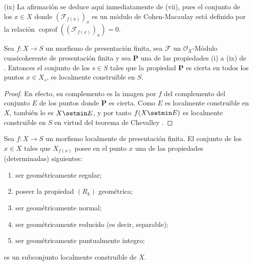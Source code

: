 (ix) La afirmación se deduce aquí inmediatamente de (vii), pues el conjunto de los $x\in X$ donde
$(\mathcal F_{f(x)})_x$ es un módulo de Cohen-Macaulay está definido por la
relación $\operatorname{coprof}((\mathcal F_{f(x)})_x)=0$.

\begin{corollary}[9.9.3]
\label{IV.9.9.3}
Sea $f:X\to S$ un morfismo de presentación finita, sea $\mathcal F$ un $\mathcal O_X$-Módulo cuasicoherente de presentación finita y sea $\boldsymbol{P}$ una de las propiedades \textup{(i)} a \textup{(ix)} de .
Entonces el conjunto de los $s\in S$ tales que la propiedad $\boldsymbol{P}$ es cierta en todos los puntos $x\in X_s$, es localmente construible en $S$.
\end{corollary}

\begin{proof}
\label{IV.9.9.3-proof}
En efecto, su complemento es la imagen por $f$ del complemento del conjunto $E$ de los puntos donde $\boldsymbol{P}$ es cierta.
Como $E$ es localmente construible en $X$, también lo es $X\setmin E$, y por tanto $f(X\setmin E)$ es localmente construible en $S$ en virtud del teorema de Chevalley .
\end{proof}

\begin{proposition}[9.9.4]
\label{IV.9.9.4}
Sea $f:X\to S$ un morfismo localmente de presentación finita.
El conjunto de los $x\in X$ tales que $X_{f(x)}$ posee en el punto $x$ una de las propiedades (determinadas) siguientes:
\begin{enumerate}[label=\textup{(\roman*)}]
  \item ser geométricamente regular;
  \item poseer la propiedad $(R_k)$ geométrica;
  \item ser geométricamente normal;
  \item ser geométricamente reducido \textup{(es decir,} separable\textup{)};
  \item ser geométricamente puntualmente íntegro;
\end{enumerate}
es un subconjunto localmente construible de $X$.
\end{proposition}

